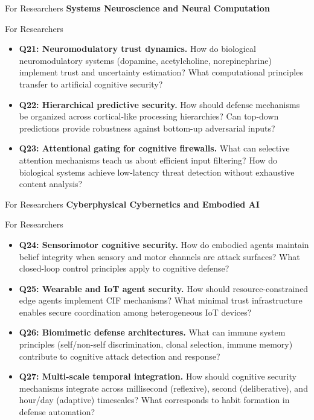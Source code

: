 \documentclass[
  ignorenonframetext,
]{beamer}
\begin{document}
\begin{frame}[allowframebreaks]{For Researchers}
\textbf{Systems Neuroscience and Neural Computation}

\end{frame}

\begin{frame}[allowframebreaks]{For Researchers}
\begin{itemize}
\item
  \textbf{Q21: Neuromodulatory trust dynamics.} How do biological
  neuromodulatory systems (dopamine, acetylcholine, norepinephrine)
  implement trust and uncertainty estimation? What computational
  principles transfer to artificial cognitive security?
\item
  \textbf{Q22: Hierarchical predictive security.} How should defense
  mechanisms be organized across cortical-like processing hierarchies?
  Can top-down predictions provide robustness against bottom-up
  adversarial inputs?
\item
  \textbf{Q23: Attentional gating for cognitive firewalls.} What can
  selective attention mechanisms teach us about efficient input
  filtering? How do biological systems achieve low-latency threat
  detection without exhaustive content analysis?
\end{itemize}

\end{frame}

\begin{frame}[allowframebreaks]{For Researchers}
\textbf{Cyberphysical Cybernetics and Embodied AI}

\end{frame}

\begin{frame}[allowframebreaks]{For Researchers}
\begin{itemize}
\item
  \textbf{Q24: Sensorimotor cognitive security.} How do embodied agents
  maintain belief integrity when sensory and motor channels are attack
  surfaces? What closed-loop control principles apply to cognitive
  defense?
\item
  \textbf{Q25: Wearable and IoT agent security.} How should
  resource-constrained edge agents implement CIF mechanisms? What
  minimal trust infrastructure enables secure coordination among
  heterogeneous IoT devices?
\item
  \textbf{Q26: Biomimetic defense architectures.} What can immune system
  principles (self/non-self discrimination, clonal selection, immune
  memory) contribute to cognitive attack detection and response?
\item
  \textbf{Q27: Multi-scale temporal integration.} How should cognitive
  security mechanisms integrate across millisecond (reflexive), second
  (deliberative), and hour/day (adaptive) timescales? What corresponds
  to habit formation in defense automation?
\end{itemize}
\end{frame}
\end{document}
